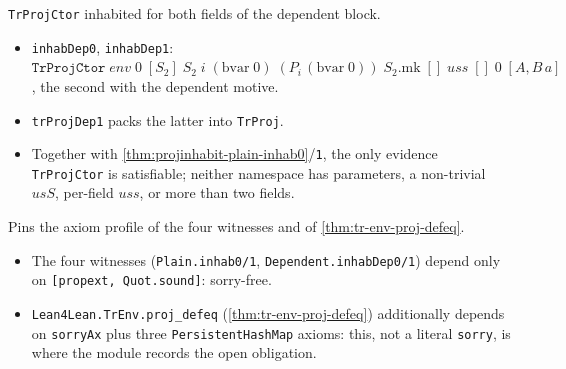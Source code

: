 \begin{example}
  \label{thm:projinhabit-dep-inhab}
  \leanok

   \texttt{TrProjCtor} inhabited for both fields of the dependent block.
  \begin{itemize}
  \item \texttt{inhabDep0}, \texttt{inhabDep1}:
        $\mathtt{TrProjCtor}\;\mathit{env}\;0\;[S_2]\;S_2\;i\;(\mathrm{bvar}\;0)\;
        (P_i\,(\mathrm{bvar}\;0))\;S_2.\mathrm{mk}\;[]\;\mathit{uss}\;[]\;0\;[A, B\,a]$, the second
        with the dependent motive.
  \item \texttt{trProjDep1} packs the latter into \texttt{TrProj}.
  \item {} Together with \ref{thm:projinhabit-plain-inhab0}/\texttt{1}, the only
        evidence \texttt{TrProjCtor} is satisfiable; neither namespace has parameters, a
        non-trivial $usS$, per-field $uss$, or more than two fields.
  \end{itemize}
\end{example}

\begin{example}
  \label{test:projinhabit-axioms}
  \leanok

   Pins the axiom profile of the four witnesses and of
  \ref{thm:tr-env-proj-defeq}.
  \begin{itemize}
  \item The four witnesses (\texttt{Plain.inhab0/1}, \texttt{Dependent.inhabDep0/1}) depend only
        on \texttt{[propext, Quot.sound]}: sorry-free.
  \item \texttt{Lean4Lean.TrEnv.proj\_defeq} (\ref{thm:tr-env-proj-defeq}) additionally depends on
        \texttt{sorryAx} plus three \texttt{PersistentHashMap} axioms: this, not a literal
        \texttt{sorry}, is where the module records the open obligation.
  \end{itemize}
\end{example}

